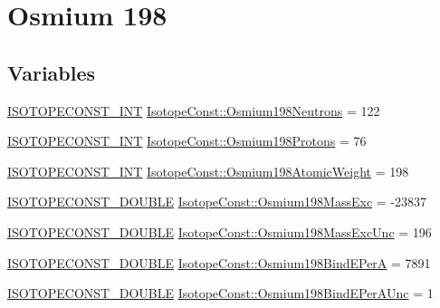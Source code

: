 \hypertarget{group___isotope_const-_osmium-_os198}{}\section{Osmium 198}
\label{group___isotope_const-_osmium-_os198}
\subsection*{Variables}
\begin{DoxyCompactItemize}
\item 
\mbox{\hyperlink{group___isotope_const-_macros_ga5f18360b3e99483a35c32d789e62621c}{I\+S\+O\+T\+O\+P\+E\+C\+O\+N\+S\+T\+\_\+\+I\+NT}} \mbox{\hyperlink{group___isotope_const-_osmium-_os198_gad6c79e028b93bdb59ad0773b9bf4b2b3}{Isotope\+Const\+::\+Osmium198\+Neutrons}} = 122
\item 
\mbox{\hyperlink{group___isotope_const-_macros_ga5f18360b3e99483a35c32d789e62621c}{I\+S\+O\+T\+O\+P\+E\+C\+O\+N\+S\+T\+\_\+\+I\+NT}} \mbox{\hyperlink{group___isotope_const-_osmium-_os198_ga715038c6149288207ee77aed2ed1f8f5}{Isotope\+Const\+::\+Osmium198\+Protons}} = 76
\item 
\mbox{\hyperlink{group___isotope_const-_macros_ga5f18360b3e99483a35c32d789e62621c}{I\+S\+O\+T\+O\+P\+E\+C\+O\+N\+S\+T\+\_\+\+I\+NT}} \mbox{\hyperlink{group___isotope_const-_osmium-_os198_ga78f6ca6604d50102d85e75cbec666de5}{Isotope\+Const\+::\+Osmium198\+Atomic\+Weight}} = 198
\item 
\mbox{\hyperlink{group___isotope_const-_macros_ga8f45a7272ce02c0b4c65c44636ed719a}{I\+S\+O\+T\+O\+P\+E\+C\+O\+N\+S\+T\+\_\+\+D\+O\+U\+B\+LE}} \mbox{\hyperlink{group___isotope_const-_osmium-_os198_ga3fe017c88b3b4982f4136138737026af}{Isotope\+Const\+::\+Osmium198\+Mass\+Exc}} = -\/23837
\item 
\mbox{\hyperlink{group___isotope_const-_macros_ga8f45a7272ce02c0b4c65c44636ed719a}{I\+S\+O\+T\+O\+P\+E\+C\+O\+N\+S\+T\+\_\+\+D\+O\+U\+B\+LE}} \mbox{\hyperlink{group___isotope_const-_osmium-_os198_gaef97c33f0e8c03667504025375ac9b11}{Isotope\+Const\+::\+Osmium198\+Mass\+Exc\+Unc}} = 196
\item 
\mbox{\hyperlink{group___isotope_const-_macros_ga8f45a7272ce02c0b4c65c44636ed719a}{I\+S\+O\+T\+O\+P\+E\+C\+O\+N\+S\+T\+\_\+\+D\+O\+U\+B\+LE}} \mbox{\hyperlink{group___isotope_const-_osmium-_os198_ga8fc39a87c3949c14652536a978ba7114}{Isotope\+Const\+::\+Osmium198\+Bind\+E\+PerA}} = 7891
\item 
\mbox{\hyperlink{group___isotope_const-_macros_ga8f45a7272ce02c0b4c65c44636ed719a}{I\+S\+O\+T\+O\+P\+E\+C\+O\+N\+S\+T\+\_\+\+D\+O\+U\+B\+LE}} \mbox{\hyperlink{group___isotope_const-_osmium-_os198_ga737b1f0c304f768a794c32c40b55525d}{Isotope\+Const\+::\+Osmium198\+Bind\+E\+Per\+A\+Unc}} = 1

\end{DoxyCompactItemize}
